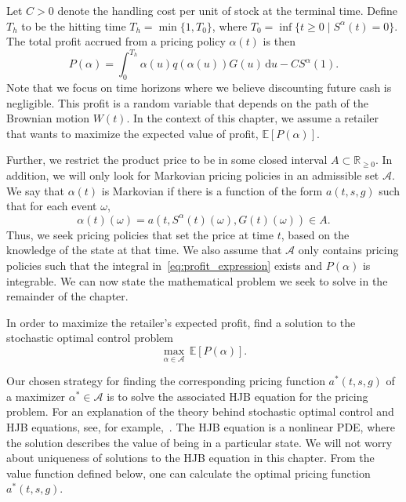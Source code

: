 \documentclass[main.tex]{subfiles}
\begin{document}
Let $C>0$ denote the handling cost per unit of stock at the terminal
time. Define $T_h$ to be the hitting time $T_h=\min \{1, T_0\}$, where
$T_0=\inf\{t\geq 0\mid S^\alpha(t)=0\}$.
The total profit accrued from a pricing policy $\alpha(t)$ is then
\begin{equation}\label{eq:profit_expression}
  P(\alpha) = \int_0^{T_h}\alpha(u)q(\alpha(u))G(u)\,\mathrm{d}u - CS^\alpha(1).
\end{equation}
Note that we focus on time horizons where we believe discounting
future cash is negligible.
This profit is a random variable that depends on the path of the
Brownian motion $W(t)$. %
In the context of this chapter, we assume a retailer that
wants to maximize the expected value of profit, $\mathbb
E[P(\alpha)]$.

Further, we restrict the product price to be in some closed  interval
$A\subset\mathbb R_{\geq 0}$.
In addition, we will only look for Markovian pricing policies in an
admissible set $\mathcal A$. We say that $\alpha(t)$ is Markovian if
there is a function of the form $a(t,s,g)$ such that for each event $\omega$,
\begin{equation}
  \alpha(t)(\omega) = a(t,S^\alpha(t)(\omega), G(t)(\omega)) \in A.
\end{equation}
Thus, we seek pricing policies that set the price at time $t$, based
on the knowledge of the state at that time. We also assume that
$\mathcal A$ only contains pricing policies such that the integral
in~\eqref{eq:profit_expression} exists and
$P(\alpha)$ is integrable. We can now state the mathematical problem we
seek to solve in the remainder of the chapter.
\begin{mydef}
  In order to maximize the retailer's expected profit, find a solution to
  the stochastic optimal control problem
  \begin{equation}\label{eq:pricing_problem}
    \max_{\alpha\in \mathcal A}\,\mathbb E[P(\alpha)].
  \end{equation}
\end{mydef}
Our chosen strategy for finding the corresponding pricing function $a^*(t,s,g)$
of a maximizer $\alpha^*\in\mathcal A$ is to solve the associated HJB
equation for the pricing problem.
For an explanation of the theory behind stochastic optimal control and
HJB equations, see, for example,~\cite{pham2009continuous}.
The HJB equation is a nonlinear PDE, where the solution describes the
value of being in a particular state. We will not worry about
uniqueness of solutions to the HJB equation in this chapter. From the
value function defined below, one can
calculate the optimal pricing function $a^*(t,s,g)$.
\end{document}
